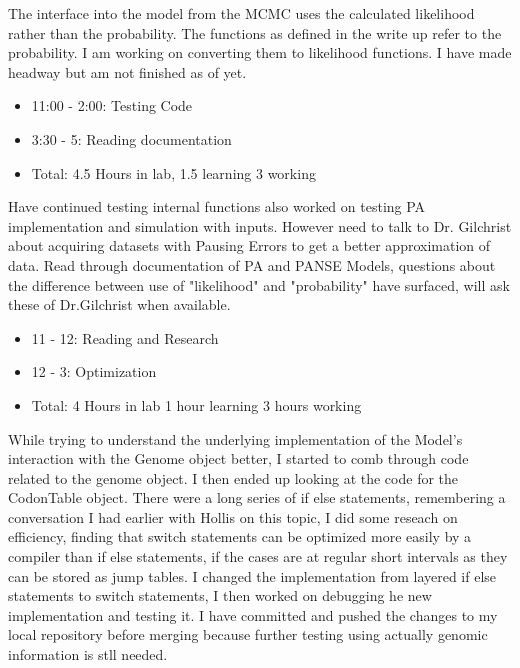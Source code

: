 \documentclass[12pt,hyperref]{labbook}
\begin{document}
The interface into the model from the MCMC uses the calculated likelihood rather than the probability. The functions as defined in the write up refer to the probability. I am working on converting them to likelihood functions. I have made headway but am not finished as of yet.
\begin{itemize}
    \item 11:00 - 2:00: Testing Code
    \item 3:30 - 5: Reading documentation
    \item Total: 4.5 Hours in lab, 1.5 learning 3 working
\end{itemize}
Have continued testing internal functions also worked on testing PA implementation and simulation with inputs. However need to talk to Dr. Gilchrist about acquiring datasets with Pausing Errors to get a better approximation of data.
Read through documentation of PA and PANSE Models, questions about the difference between use of "likelihood" and "probability" have surfaced, will ask these of Dr.Gilchrist when available.
\begin{itemize}
    \item 11 - 12: Reading and Research
    \item 12 - 3: Optimization
    \item Total: 4 Hours in lab 1 hour learning 3 hours working
\end{itemize}
While trying to understand the underlying implementation of the Model's interaction with the Genome object better, I started to comb through code related to the genome object. I then ended up looking at the code for the CodonTable object. There were a long series of if else statements, remembering a conversation I had earlier with Hollis on this topic, I did some reseach on efficiency, finding that switch statements can be optimized more easily by a compiler than if else statements, if the
cases are at regular short intervals as they can be stored as jump tables.
I changed the implementation from layered if else statements to switch statements, I then worked on debugging he new implementation and testing it. I have committed and pushed the changes to my local repository before merging because further testing using actually genomic information is stll needed.
\end{document}
